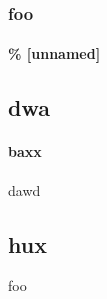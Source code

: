 \documentclass[]{article}
\begin{document}
\section{foo}

\subsection*{\% [unnamed] }

\begin{center}
\part*{dwa}

\end{center}

\subsection{baxx}


dawd

\chapter{hux}

foo
\end{document}
